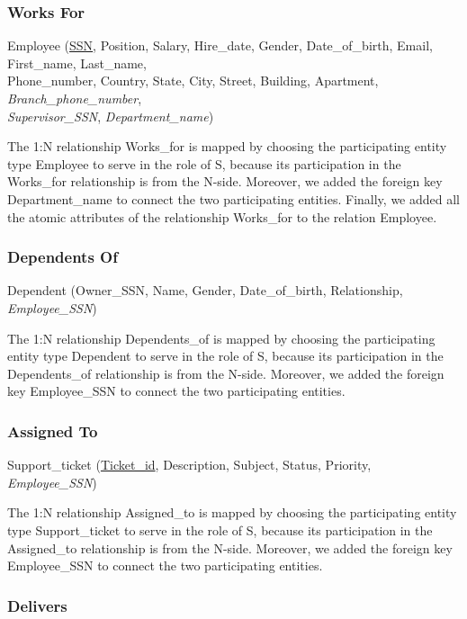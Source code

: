 \documentclass[11pt]{article}
\begin{document}
\subsubsection{Works For}

Employee (\underline{SSN}, Position, Salary, Hire\_date, Gender, Date\_of\_birth, Email, First\_name, Last\_name, \\
Phone\_number, Country, State, City, Street, Building, Apartment, \textit{Branch\_phone\_number}, \\
\textit{Supervisor\_SSN}, \textit{Department\_name})

The 1:N relationship Works\_for is mapped by choosing the participating entity type Employee to serve in the role of S, because its participation in the Works\_for relationship is from the N-side. Moreover, we added the foreign key Department\_name to connect the two participating entities. Finally, we added all the atomic attributes of the relationship Works\_for to the relation Employee.

\subsubsection{Dependents Of}

Dependent (Owner\_SSN, Name, Gender, Date\_of\_birth, Relationship, \textit{Employee\_SSN})

The 1:N relationship Dependents\_of is mapped by choosing the participating entity type Dependent to serve in the role of S, because its participation in the Dependents\_of relationship is from the N-side. Moreover, we added the foreign key Employee\_SSN to connect the two participating entities.

\subsubsection{Assigned To}

Support\_ticket (\underline{Ticket\_id}, Description, Subject, Status, Priority, \textit{Employee\_SSN})

The 1:N relationship Assigned\_to is mapped by choosing the participating entity type Support\_ticket to serve in the role of S, because its participation in the Assigned\_to relationship is from the N-side. Moreover, we added the foreign key Employee\_SSN to connect the two participating entities.

\subsubsection{Delivers}
\end{document}

